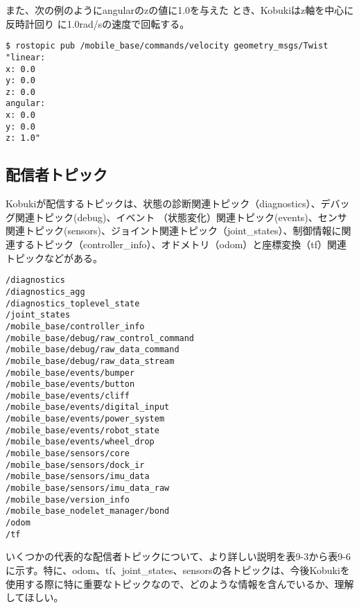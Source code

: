 また、次の例のようにangularのzの値に1.0を与えた    とき、Kobukiはz軸を中心に反時計回り  に1.0rad/sの速度で回転する。

\begin{lstlisting}[language=ROS]
$ rostopic pub /mobile_base/commands/velocity geometry_msgs/Twist "linear:
x: 0.0
y: 0.0
z: 0.0
angular:
x: 0.0
y: 0.0
z: 1.0"
\end{lstlisting}

\subsection{配信者トピック}

Kobukiが配信するトピックは、状態の診断関連トピック（diagnostics）、デバッグ関連トピック(debug)、イベント  （状態変化）関連トピック(events)、センサ関連トピック(sensors)、ジョイント関連トピック（joint\_states）、制御情報に関連するトピック（controller\_info）、オドメトリ（odom）と座標変換（tf）関連トピックなどがある。

\begin{lstlisting}[language=ROS]
/diagnostics
/diagnostics_agg
/diagnostics_toplevel_state
/joint_states
/mobile_base/controller_info
/mobile_base/debug/raw_control_command
/mobile_base/debug/raw_data_command
/mobile_base/debug/raw_data_stream
/mobile_base/events/bumper
/mobile_base/events/button
/mobile_base/events/cliff
/mobile_base/events/digital_input
/mobile_base/events/power_system
/mobile_base/events/robot_state
/mobile_base/events/wheel_drop
/mobile_base/sensors/core
/mobile_base/sensors/dock_ir
/mobile_base/sensors/imu_data
/mobile_base/sensors/imu_data_raw
/mobile_base/version_info
/mobile_base_nodelet_manager/bond
/odom
/tf
\end{lstlisting}

いくつかの代表的な配信者トピックについて、より詳しい説明を表9-3から表9-6に示す。特に、odom、tf、joint\_states、sensorsの各トピックは、今後Kobukiを使用する際に特に重要なトピックなので、どのような情報を含んでいるか、理解してほしい。

